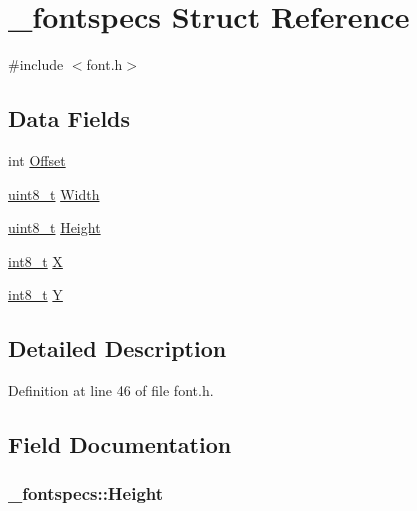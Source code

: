 \hypertarget{struct__fontspecs}{\section{\-\_\-fontspecs Struct Reference}
\label{struct__fontspecs}
}


{\ttfamily \#include $<$font.\-h$>$}

\subsection*{Data Fields}
\begin{DoxyCompactItemize}
\item 
int \hyperlink{struct__fontspecs_ad4ef5755b58ecd3bbc9894cee258091e}{Offset}
\item 
\hyperlink{earth2wireframe_8c_aba7bc1797add20fe3efdf37ced1182c5}{uint8\-\_\-t} \hyperlink{struct__fontspecs_a8404888a24a2b065d91c4424e1907439}{Width}
\item 
\hyperlink{earth2wireframe_8c_aba7bc1797add20fe3efdf37ced1182c5}{uint8\-\_\-t} \hyperlink{struct__fontspecs_a33e92e50bd86f34db768e027e4736089}{Height}
\item 
\hyperlink{earth2wireframe_8c_aef44329758059c91c76d334e8fc09700}{int8\-\_\-t} \hyperlink{struct__fontspecs_a7273a891c79308389718266cb0b66f56}{X}
\item 
\hyperlink{earth2wireframe_8c_aef44329758059c91c76d334e8fc09700}{int8\-\_\-t} \hyperlink{struct__fontspecs_a9771541eab33755d22c804f3bedf8682}{Y}
\end{DoxyCompactItemize}


\subsection{Detailed Description}


Definition at line 46 of file font.\-h.



\subsection{Field Documentation}
\hypertarget{struct__fontspecs_a33e92e50bd86f34db768e027e4736089}{
\subsubsection[{Height}]{ \-\_\-fontspecs\-::\-Height}}\label{struct__fontspecs_a33e92e50bd86f34db768e027e4736089}


